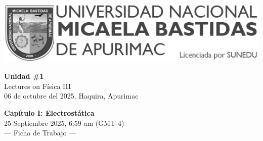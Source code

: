 


\begin{minipage}[l]{0.42\textwidth}
    \includegraphics[width=1\textwidth]{img/logo-UNAMBA.png}
\end{minipage}
\hfill
\begin{minipage}[c]{0.5\textwidth}
    \begin{flushright}
	\large{\textbf{Unidad \#1}}\\
	\large{Lectures on Física III}\\
	\large{06 de octubre del 2025. Haquira, Apurimac}\\
    \end{flushright}
\end{minipage}


  
 \begin{multicols}{3}
    \begin{center}
         \LARGE{\textbf{Capítulo I: Electrostática}}\\	
         \vspace{1.2cm}
         \large{25 Septiembre 2025, 6:59 am (GMT-4)}\\
         \large{— Ficha de Trabajo —}
    \end{center}
    
    
    
    
    
    
    
    
   


\end{multicols}

